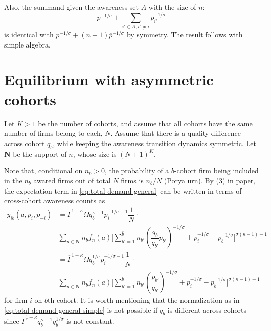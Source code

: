 \documentclass[12pt]{article}
\theoremstyle{definition}
\begin{document}
Also, the summand given the awareness set $A$ with the size of $n$: 
$$
p^{-1/\sigma} + \sum_{i' \in A, i' \neq i} p_{i'}^{-1/\sigma}
$$
is identical with $p ^{-1/\sigma} + (n-1) \overline{p}^{-1/\sigma}$ by symmetry. The result follows with simple algebra.

\section{Equilibrium with asymmetric cohorts}
Let $K > 1$ be the number of cohorts, and assume that all cohorts have the same number of firms belong to each, $N$. Assume that there is a quality difference across cohort $q_{b}$, while keeping the awareness transition dynamics symmetric. Let $\mathbf{N}$ be the support of $  n$, whose size is $(N+1)^K$.

Note that, conditional on $n_b > 0$, the probability of a $b$-cohort firm being included in the $n_b$ awared firms out of total $N$ firms is $n_b /N$ (Porya urn). By (3) in paper, the expectation term in \autoref{eq:total-demand-general} can be written in terms of cross-cohort awareness counts as
\begin{equation}
\begin{aligned}
y_{ib}(a, p_i, p_{-i}) &=  \overline{\Gamma}^{1 - \kappa} \Omega q_b^{\kappa-1} p_i^{-1/\sigma-1} \dfrac{1}{N} \cdot \\ 
&\sum_{ n \in \mathbf{N} } n_b f_{n}(a) \Bigg[ \sum_{b' =1 }^{\bar{b}} n_{b'} \left( \dfrac{q_b}{q_{b'}} p_{b'} \right)^{-1/\sigma} +   
 p_i^{-1/\sigma}   - p^{-1/\sigma}_{b}  \Bigg]^{\sigma(\kappa-1) -1}  \\ 
&=  \overline{\Gamma}^{1 - \kappa} \Omega q_b^{1/\sigma} p_i^{-1/\sigma-1} \dfrac{1}{N} \cdot \\ 
 &\sum_{ n \in \mathbf{N} } n_b f_n(a) \Bigg[ \sum_{b' =1 }^{\bar{b}} n_{b'} \left( \dfrac{p_{b'}}{q_{b'}}  \right)^{-1/\sigma} +   
 p_i^{-1/\sigma}   - p^{-1/\sigma}_{b}  \Bigg]^{\sigma(\kappa-1) -1}
\end{aligned}
\end{equation}
for firm $i$ on $b$th cohort. It is worth mentioning that the normalization as in \autoref{eq:total-demand-general-simple} is not possible if $q_b$ is different across cohorts  since $\overline{\Gamma}^{1-\kappa}  q_b^{\kappa-1} q_b^{1/\sigma}$ is not constant.
\end{document}
